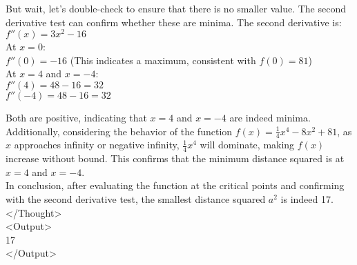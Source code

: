 \begin{abox}
But wait, let's double-check to ensure that there is no smaller value. The second derivative test can confirm whether these are minima. The second derivative is:\\

$ f''(x) = 3x^2 - 16 $\\

At $ x = 0 $:\\

$ f''(0) = -16 $ (This indicates a maximum, consistent with $ f(0) = 81 $)\\

At $ x = 4 $ and $ x = -4 $:\\

$ f''(4) = 48 - 16 = 32 $\\
$ f''(-4) = 48 - 16 = 32 $

Both are positive, indicating that $ x = 4 $ and $ x = -4 $ are indeed minima.\\

Additionally, considering the behavior of the function $ f(x) = \frac{1}{4}x^4 - 8x^2 + 81 $, as $ x $ approaches infinity or negative infinity, $ \frac{1}{4}x^4 $ will dominate, making $ f(x) $ increase without bound. This confirms that the minimum distance squared is at $ x = 4 $ and $ x = -4 $.\\

In conclusion, after evaluating the function at the critical points and confirming with the second derivative test, the smallest distance squared $ a^2 $ is indeed 17.\\
</Thought>\\

<Output>\\
17\\
</Output>

\end{abox}

